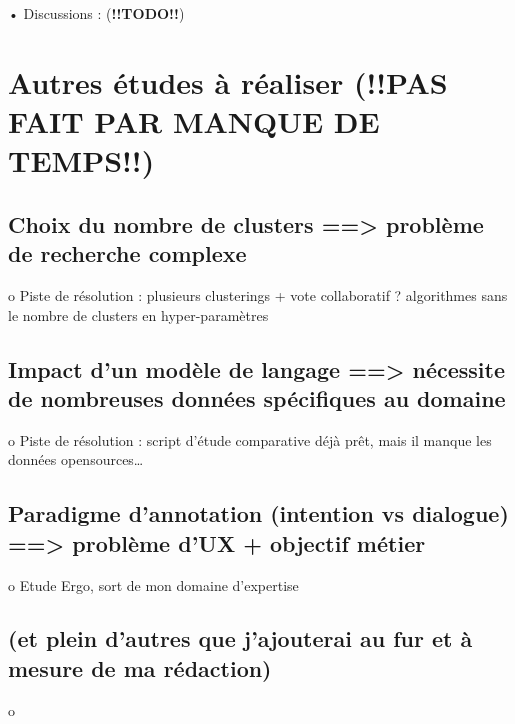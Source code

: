         •	Discussions : (\textbf{!!TODO!!})

    \section{Autres études à réaliser (!!PAS FAIT PAR MANQUE DE TEMPS!!)}

        \subsection{Choix du nombre de clusters ==> problème de recherche complexe}
            o	Piste de résolution : plusieurs clusterings + vote collaboratif ? algorithmes sans le nombre de clusters en hyper-paramètres

        \subsection{Impact d’un modèle de langage ==> nécessite de nombreuses données spécifiques au domaine}
            o	Piste de résolution : script d’étude comparative déjà prêt, mais il manque les données opensources… 

        \subsection{Paradigme d’annotation (intention vs dialogue) ==> problème d’UX + objectif métier}
            o	Etude Ergo, sort de mon domaine d’expertise

        \subsection{(et plein d’autres que j’ajouterai au fur et à mesure de ma rédaction)}
            o	